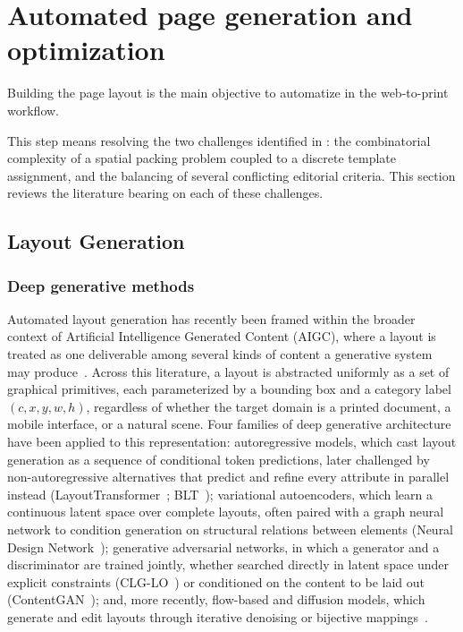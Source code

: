 

\section{Automated page generation and optimization}
\label{sec:sota-pagegen}

Building the page layout is the main objective to automatize in the \melody web-to-print workflow. 

This step means resolving the two challenges identified in : the combinatorial complexity of a spatial packing problem coupled to a discrete template assignment, and the balancing of several conflicting editorial criteria. This section reviews the literature bearing on each of these challenges.

\subsection{Layout Generation}
\label{sec:sota-layout-synthesis}

\subsubsection{Deep generative methods}
Automated layout generation has recently been framed within the broader context of Artificial Intelligence Generated Content (AIGC), where a layout is treated as one deliverable among several kinds of content a generative system may produce~\cite{shi-2023}. Across this literature, a layout is abstracted uniformly as a set of graphical primitives, each parameterized by a bounding box and a category label $(c, x, y, w, h)$, regardless of whether the target domain is a printed document, a mobile interface, or a natural scene. Four families of deep generative architecture have been applied to this representation: autoregressive models, which cast layout generation as a sequence of conditional token predictions, later challenged by non-autoregressive alternatives that predict and refine every attribute in parallel instead (LayoutTransformer~\cite{gupta_layouttransformer_2021}; BLT~\cite{kong-2022}); variational autoencoders, which learn a continuous latent space over complete layouts, often paired with a graph neural network to condition generation on structural relations between elements (Neural Design Network~\cite{Lee-2020}); generative adversarial networks, in which a generator and a discriminator are trained jointly, whether searched directly in latent space under explicit constraints (CLG-LO~\cite{kikuchi-2021}) or conditioned on the content to be laid out (ContentGAN~\cite{zheng-2019}); and, more recently, flow-based and diffusion models, which generate and edit layouts through iterative denoising or bijective mappings~\cite{shi-2023}.

